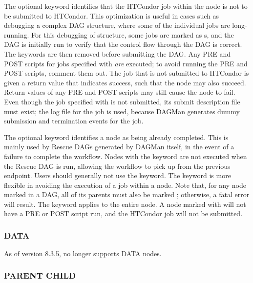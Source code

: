 \label{dagman:NOOP}
The optional  keyword identifies that the HTCondor job within
the node is not to be submitted to HTCondor.
This optimization is useful in cases such as debugging a complex DAG structure,
where some of the individual jobs are long-running.
For this debugging of structure,
some jobs are marked as s, and
the DAG is initially run to verify that the control flow through
the DAG is correct.
The  keywords are then removed before submitting the DAG.
Any PRE and POST scripts
for jobs specified with  \emph{are} executed;
to avoid running the PRE and POST scripts, comment them out.
The job that is not submitted to HTCondor is given a return value that indicates
success, such that the node may also succeed.
Return values of any 
PRE and POST scripts may still cause the node to fail.
Even though the job specified with  is not submitted,
its submit description file must exist;
the log file for the job is used, 
because DAGMan generates dummy submission and termination events for the job.

The optional  keyword identifies a node as being already
completed.
This is mainly used by Rescue DAGs generated by DAGMan itself,
in the event of a failure to complete the workflow.
Nodes with the  keyword are not executed when the Rescue DAG is run,
allowing the workflow to pick up from the previous endpoint.  Users
should generally not use the  keyword.
The  keyword is more flexible in avoiding
the execution of a job within a node.
Note that, for any node marked  in a DAG, all of
its parents must also be marked ; 
otherwise, a fatal error will result.
The  keyword applies to the entire node.
A node marked with  will not have a PRE or POST script run,
and the HTCondor job will not be submitted.

\subsubsection{\label{sec:dagman_data_command}DATA}
\label{dagman:DATA}

As of version 8.3.5,  no longer supports DATA nodes.

\subsubsection{\label{sec:dagman_parent_child_command}PARENT \Dots CHILD}
\label{dagman:ParentChild}

